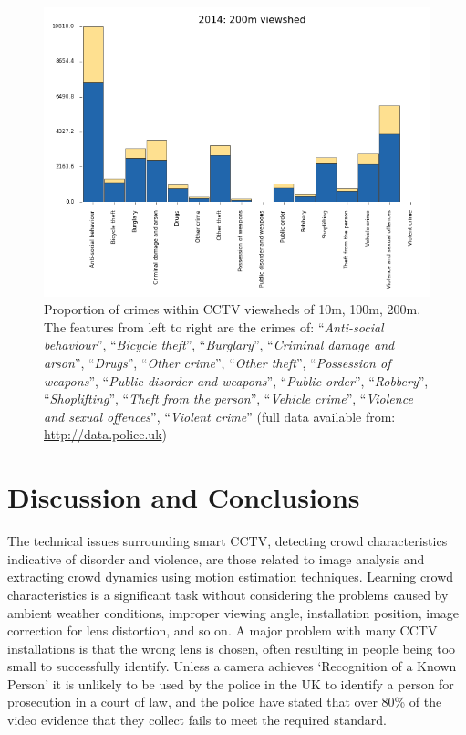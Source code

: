 \documentclass[conference]{IEEEtran}
\begin{document}
\begin{figure}[!htp]
\includegraphics[width=\columnwidth]{images/2014-200m.png}
\caption{Proportion of crimes within CCTV viewsheds of 10m, 100m,
  200m. The features from left to right are the crimes of:
``{\emph{Anti-social behaviour}}'', ``{\emph{Bicycle theft}}'',
``{\emph{Burglary}}'', ``{\emph{Criminal damage and arson}}'',
``{\emph{Drugs}}'', ``{\emph{Other crime}}'', ``{\emph{Other
theft}}'', ``{\emph{Possession of weapons}}'', ``{\emph{Public
disorder and weapons}}'', ``{\emph{Public order}}'',
``{\emph{Robbery}}'', ``{\emph{Shoplifting}}'', ``{\emph{Theft from
the person}}'', ``{\emph{Vehicle crime}}'', ``{\emph{Violence and
sexual offences}}'', ``{\emph{Violent crime}}'' (full data available
from: \url{http://data.police.uk})}
\label{fig:cctvcrimes}
\end{figure}


\section{Discussion and Conclusions}\label{disc}

The technical issues surrounding smart CCTV, detecting crowd
characteristics indicative of disorder and violence, are those related
to image analysis and extracting crowd dynamics using motion
estimation techniques. Learning crowd characteristics is a significant
task without considering the problems caused by ambient weather
conditions, improper viewing angle, installation position, image
correction for lens distortion, and so on.  A major problem with many
CCTV installations is that the wrong lens is chosen, often resulting
in people being too small to successfully identify. Unless a camera
achieves `Recognition of a Known Person' it is unlikely to be used by
the police in the UK to identify a person for prosecution in a court
of law, and the police have stated that over 80\% of the video
evidence that they collect fails to meet the required standard.
\end{document}
